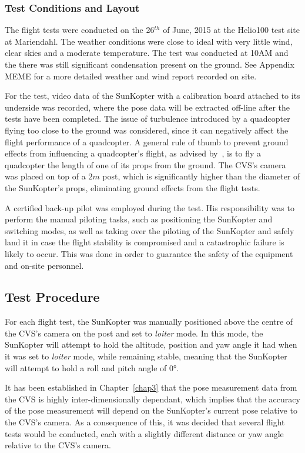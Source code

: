 \subsubsection{Test Conditions and Layout}

The flight tests were conducted on the 26$^{th}$ of June, 2015 at the Helio100 test site at Mariendahl. The weather conditions were close to ideal with very little wind, clear skies and a moderate temperature. The test was conducted at 10AM and the there was still significant condensation present on the ground. See Appendix MEME for a more detailed weather and wind report recorded on site.

For the test, video data of the SunKopter with a calibration board attached to its underside was recorded, where the pose data will be extracted off-line after the tests have been completed. The issue of turbulence introduced by a quadcopter flying too close to the ground was considered, since it can negatively affect the flight performance of a quadcopter. A general rule of thumb to prevent ground effects from influencing a quadcopter's flight, as advised by~\cite{basson-flight-test}, is to fly a quadcopter the length of one of its props from the ground. The CVS's camera was placed on top of a $2m$ post, which is significantly higher than the diameter of the SunKopter's props, eliminating ground effects from the flight tests.

A certified back-up pilot was employed during the test. His responsibility was to perform the manual piloting tasks, such as positioning the SunKopter and switching modes, as well as taking over the piloting of the SunKopter and safely land it in case the flight stability is compromised and a catastrophic failure is likely to occur. This was done in order to guarantee the safety of the equipment and on-site personnel. 

\subsection{Test Procedure}

For each flight test, the SunKopter was manually positioned above the centre of the CVS's camera on the post and set to \emph{loiter} mode. In this mode, the SunKopter will attempt to hold the altitude, position and yaw angle it had when it was set to \emph{loiter} mode, while remaining stable, meaning that the SunKopter will attempt to hold a roll and pitch angle of $\ang{0}$. 

It has been established in Chapter~\ref{chap3} that the pose measurement data from the CVS is highly inter-dimensionally dependant, which implies that the accuracy of the pose measurement will depend on the SunKopter's current pose relative to the CVS's camera. As a consequence of this, it was decided that several flight tests would be conducted, each with a slightly different distance or yaw angle relative to the CVS's camera. 

